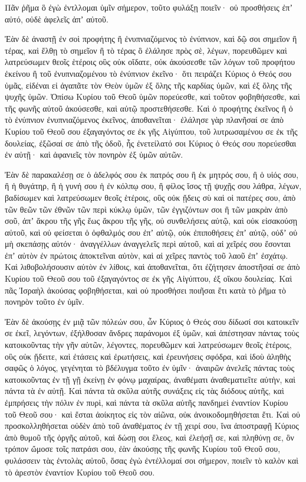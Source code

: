 {Πᾶν ῥῆμα ὃ ἐγὼ ἐντλλομαι ὑμῖν σήμερον, τοῦτο φυλάξῃ ποιεῖν· οὐ προσθήσεις ἐπʼ αὐτό, οὐδὲ ἀφελεῖς ἀπʼ αὐτοῦ.
\par }{\PP {}Ἐὰν δὲ ἀναστῇ ἐν σοὶ προφήτης ἢ ἐνυπνιαζόμενος τὸ ἐνύπνιον, καὶ δῷ σοι σημεῖον ἢ τέρας,
καὶ ἔλθῃ τὸ σημεῖον ἢ τὸ τέρας ὃ ἐλάλησε πρὸς σὲ, λέγων, πορευθῶμεν καὶ λατρεύσωμεν θεοῖς ἑτέροις οὓς οὐκ οἴδατε,
οὐκ ἀκούσεσθε τῶν λόγων τοῦ προφήτου ἐκείνου ἢ τοῦ ἐνυπνιαζομένου τὸ ἐνύπνιον ἐκεῖνο· ὅτι πειράζει Κύριος ὁ Θεός σου ὑμᾶς, εἰδέναι εἰ ἀγαπᾶτε τὸν Θεὸν ὑμῶν ἐξ ὅλης τῆς καρδίας ὑμῶν, καὶ ἐξ ὅλης τῆς ψυχῆς ὑμῶν.
Ὀπίσω Κυρίου τοῦ Θεοῦ ὑμῶν πορεύεσθε, καὶ τοῦτον φοβηθήσεσθε, καὶ τῆς φωνῆς αὐτοῦ ἀκούσεσθε, καὶ αὐτῷ προστεθήσεσθε.
Καὶ ὁ προφήτης ἐκεῖνος ἢ ὁ τὸ ἐνύπνιον ἐνυπνιαζόμενος ἐκεῖνος, ἀποθανεῖται· ἐλάλησε γὰρ πλανῆσαί σε ἀπὸ Κυρίου τοῦ Θεοῦ σου ἐξαγαγόντος σε ἐκ γῆς Αἰγύπτου, τοῦ λυτρωσαμένου σε ἐκ τῆς δουλείας, ἐξῶσαί σε ἀπὸ τῆς ὁδοῦ, ἧς ἐνετείλατό σοι Κύριος ὁ Θεός σου πορεύεσθαι ἐν αὐτῇ· καὶ ἀφανιεῖς τὸν πονηρὸν ἐξ ὑμῶν αὐτῶν.
\par }{\PP {}Ἐὰν δὲ παρακαλέσῃ σε ὁ ἀδελφός σου ἐκ πατρός σου ἢ ἐκ μητρός σου, ἢ ὁ υἱός σου, ἢ ἡ θυγάτηρ, ἢ ἡ γυνή σου ἡ ἐν κόλπῳ σου, ἢ φίλος ἴσος τῇ ψυχῇς σου λάθρα, λέγων, βαδίσωμεν καὶ λατρεύσωμεν θεοῖς ἑτέροις, οὓς οὐκ ᾔδεις σὺ καὶ οἱ πατέρες σου,
ἀπὸ τῶν θεῶν τῶν ἐθνῶν τῶν περὶ κύκλῳ ὑμῶν, τῶν ἐγγιζόντων σοι ἢ τῶν μακρὰν ἀπὸ σοῦ, ἀπʼ ἄκρου τῆς γῆς ἕως ἄκρου τῆς γῆς,
οὐ συνθελήσεις αὐτῷ, καὶ οὐκ εἰσακούσῃ αὐτοῦ, καὶ οὐ φείσεται ὁ ὀφθαλμός σου ἐπʼ αὐτῷ, οὐκ ἐπιποθήσεις ἐπʼ αὐτῷ, οὐδʼ οὐ μὴ σκεπάσῃς αὐτόν·
ἀναγγέλλων ἀναγγελεῖς περὶ αὐτοῦ, καὶ αἱ χεῖρές σου ἔσονται ἐπʼ αὐτὸν ἐν πρώτοις ἀποκτεῖναι αὐτὸν, καὶ αἱ χεῖρες παντὸς τοῦ λαοῦ ἐπʼ ἐσχάτῳ.
Καὶ λιθοβολήσουσιν αὐτὸν ἐν λίθοις, καὶ ἀποθανεῖται, ὅτι ἐζήτησεν ἀποστῆσαί σε ἀπὸ Κυρίου τοῦ Θεοῦ σου τοῦ ἐξαγαγόντος σε ἐκ γῆς Αἰγύπτου, ἐξ οἴκου δουλείας.
Καὶ πᾶς Ἰσραὴλ ἀκούσας φοβηθήσεται, καὶ οὐ προσθήσει ποιῆσαι ἔτι κατὰ τὸ ῥῆμα τὸ πονηρὸν τοῦτο ἐν ὑμῖν.
\par }{\PP {}Ἐὰν δὲ ἀκούσῃς ἐν μιᾷ τῶν πόλεών σου, ὧν Κύριος ὁ Θεός σου δίδωσί σοι κατοικεῖν σε ἐκεῖ, λεγόντων,
ἐξήλθοσαν ἄνδρες παράνομοι ἐξ ὑμῶν, καὶ ἀπέστησαν πάντας τοὺς κατοικοῦντας τὴν γῆν αὐτῶν, λέγοντες, πορευθῶμεν καὶ λατρεύσωμεν θεοῖς ἑτέροις, οὓς οὐκ ᾔδειτε,
καὶ ἐτάσεις καὶ ἐρωτήσεις, καὶ ἐρευνήσεις σφόδρα, καὶ ἰδοὺ ἀληθὴς σαφῶς ὁ λόγος, γεγένηται τὸ βδέλυγμα τοῦτο ἐν ὑμῖν·
ἀναιρῶν ἀνελεῖς πάντας τοὺς κατοικοῦντας ἐν τῇ γῇ ἐκείνῃ ἐν φόνῳ μαχαίρας, ἀναθέματι ἀναθεματιεῖτε αὐτὴν, καὶ πάντα τὰ ἐν αὐτῇ.
Καὶ πάντα τὰ σκῦλα αὐτῆς συνάξεις εἰς τὰς διόδους αὐτῆς, καὶ ἐμπρήσεις τὴν πόλιν ἐν πυρὶ, καὶ πάντα τὰ σκῦλα αὐτῆς πανδημεὶ ἐναντίον Κυρίου τοῦ Θεοῦ σου· καὶ ἔσται ἀοίκητος εἰς τὸν αἰῶνα, οὐκ ἀνοικοδομηθήσεται ἔτι.
Καὶ οὐ προσκολληθήσεται οὐδὲν ἀπὸ τοῦ ἀναθέματος ἐν τῇ χειρί σου, ἵνα ἀποστραφῇ Κύριος ἀπὸ θυμοῦ τῆς ὀργῆς αὐτοῦ, καὶ δώσῃ σοι ἔλεος, καὶ ἐλεήσῇ σε, καὶ πληθύνῃ σε, ὃν τρόπον ὤμοσε τοῖς πατράσι σου,
ἐὰν ἀκούσῃς τῆς φωνῆς Κυρίου τοῦ Θεοῦ σου, φυλάσσειν τὰς ἐντολὰς αὐτοῦ, ὅσας ἐγὼ ἐντέλλομαί σοι σήμερον, ποιεῖν τὸ καλὸν καὶ τὸ ἀρεστὸν ἐναντίον Κυρίου τοῦ Θεοῦ σου.

}
